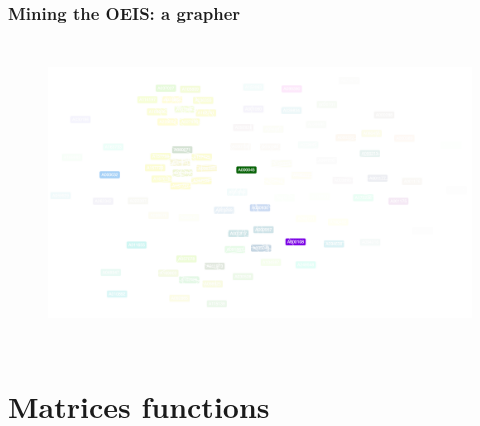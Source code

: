 \documentclass[9pt]{beamer}
\begin{document}
\begin{frame}[fragile]
\frametitle{Mining the OEIS: a grapher}
\begin{figure}
\includegraphics[width=12cm,height=8cm]{coloured}

\end{figure}
\end{frame}

\section{Matrices functions}
\end{document}
